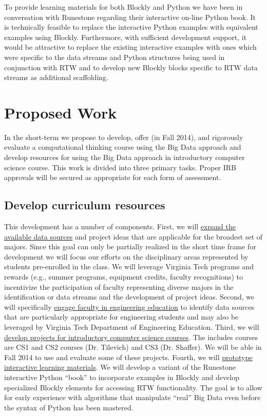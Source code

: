 \documentclass[11pt]{article}
\begin{document}
To provide learning materials for both Blockly and Python we have been in conversation with Runestone regarding their interactive on-line Python book\cite{runestone}. It is technically feasible to replace the interactive Python examples with equivalent examples using Blockly. Furthermore, with sufficient development support, it would be attractive to replace the existing interactive examples with ones which were specific to the data streams and Python structures being used in conjunction with RTW and to develop new Blockly blocks specific to RTW data streams as additional scaffolding.


\section{Proposed Work}

In the short-term we propose to develop, offer (in Fall 2014), and rigorously evaluate a computational thinking course using the Big Data approach and develop resources for using the Big Data approach in introductory computer science course.  This work is divided into three primary tasks. Proper IRB approvals will be secured as appropriate for each form of assessment.

\subsection{Develop curriculum resources}

This development has a number of components. First, we will \uline{expand the available data sources} and project ideas that are applicable for the broadest set of majors. Since this goal can only be partially realized in the short time frame for development we will focus our efforts on the disciplinary areas represented by students pre-enrolled in the class. We will leverage Virginia Tech programs and rewards (e.g., summer programs, equipment credits, faculty recognitions) to incentivize the participation of faculty representing diverse majors in the identification or data streams and the development of project ideas. Second, we will specifically \uline{engage faculty in engineering education} to identify data sources that are particularly appropriate for engineering students and may also be leveraged by Virginia Tech Department of Engineering Education. Third, we will \uline{develop projects for introductory computer science courses}. The includes courses are CS1 and CS2 courses (Dr. Tilevich) and CS3 (Dr. Shaffer). We will be able in Fall 2014 to use and evaluate some of these projects. Fourth, we will \uline{prototype interactive learning materials}.  We will develop a variant of the Runestone interactive Python ``book'' to incorporate examples in Blockly and develop specialized Blockly elements for accessing RTW functionality. The goal is to allow for early experience with algorithms that manipulate ``real'' Big Data even before the syntax of Python has been mastered.
\end{document}
